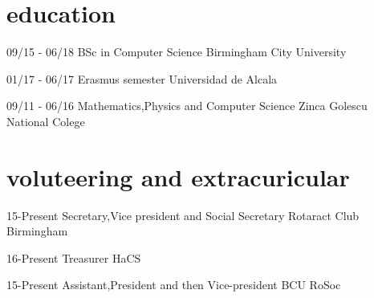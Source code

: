 \documentclass[]{friggeri-cv}
\begin{document}
\section{education}
\begin{entrylist}
  \entry
  {09/15 - 06/18}
  {BSc in Computer Science}
  {Birmingham City University}
  {}
  
  \entry
  {01/17 - 06/17}
  {Erasmus semester }
  {Universidad de Alcala}
  {}
  \end{entrylist}
  
  \entry
  {09/11 - 06/16}
  {Mathematics,Physics and Computer Science}
  {Zinca Golescu National Colege}
  {}

\section{voluteering and extracuricular}
\begin{entrylist}

    \entry
    {15-Present}
    {Secretary,Vice president and Social Secretary}
    {Rotaract Club Birmingham}
    ~
    
    \entry
    {16-Present}
    {Treasurer}
    {HaCS}
    ~ 
    
    \entry
    {15-Present}
    {Assistant,President and then Vice-president}
    {BCU RoSoc}
    
    
    
\end{entrylist}
\end{document}
